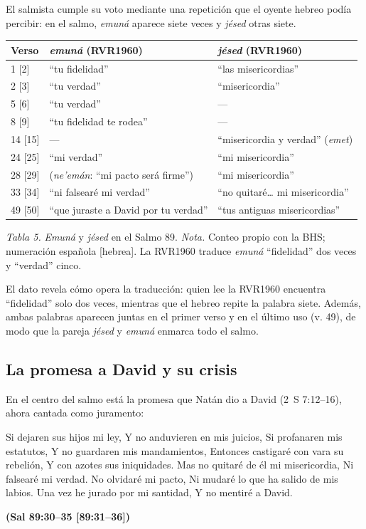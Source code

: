 \documentclass[11pt,letterpaper]{article}
\newcommand{\fuente}[1]{\par\hfill{\upshape\bfseries\small\textcolor{azul}{#1}}}
\begin{document}
El salmista cumple su voto mediante una repetición que el oyente hebreo podía percibir: en el salmo, \emph{emuná} aparece siete veces y \emph{jésed} otras siete.

\begin{center}\small\renewcommand{\arraystretch}{1.18}
\begin{tabular}{@{}L{1.6cm}L{6.4cm}L{6.4cm}@{}}
\toprule
\textbf{Verso} & \textbf{\emph{emuná}} (RVR1960) & \textbf{\emph{jésed}} (RVR1960) \\  [2] & ``tu fidelidad'' & ``las misericordias'' \\
2 [3] & ``tu verdad'' & ``misericordia'' \\
5 [6] & ``tu verdad'' & --- \\
8 [9] & ``tu fidelidad te rodea'' & --- \\
14 [15] & --- & ``misericordia y verdad'' (\emph{emet}) \\
24 [25] & ``mi verdad'' & ``mi misericordia'' \\
28 [29] & (\emph{ne'emán}: ``mi pacto será firme'') & ``mi misericordia'' \\
33 [34] & ``ni falsearé mi verdad'' & ``no quitaré\ldots{} mi misericordia'' \\
49 [50] & ``que juraste a David por tu verdad'' & ``tus antiguas misericordias'' \\
\bottomrule
\end{tabular}\par
{\footnotesize\color{gris}\textit{Tabla 5.} \emph{Emuná} y \emph{jésed} en el Salmo 89. \textit{Nota.} Conteo propio con la BHS; numeración española [hebrea]. La RVR1960 traduce \emph{emuná} ``fidelidad'' dos veces y ``verdad'' cinco.}
\end{center}

El dato revela cómo opera la traducción: quien lee la RVR1960 encuentra ``fidelidad'' solo dos veces, mientras que el hebreo repite la palabra siete. Además, ambas palabras aparecen juntas en el primer verso y en el último uso (v. 49), de modo que la pareja \emph{jésed} y \emph{emuná} enmarca todo el salmo.

\subsection{La promesa a David y su crisis}
En el centro del salmo está la promesa que Natán dio a David (2~S 7:12--16), ahora cantada como juramento:

\begin{cita}Si dejaren sus hijos mi ley, Y no anduvieren en mis juicios, Si profanaren mis estatutos, Y no guardaren mis mandamientos, Entonces castigaré con vara su rebelión, Y con azotes sus iniquidades. Mas no quitaré de él mi misericordia, Ni falsearé mi verdad. No olvidaré mi pacto, Ni mudaré lo que ha salido de mis labios. Una vez he jurado por mi santidad, Y no mentiré a David.\fuente{(Sal 89:30--35 [89:31--36])}\end{cita}
\end{document}
